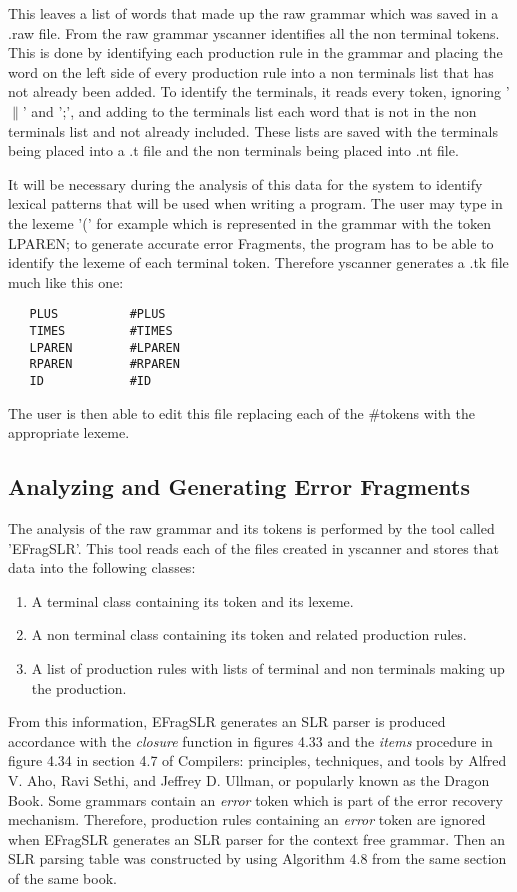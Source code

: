 \documentclass{article}
\begin{document}
This leaves a list of words that made up the raw grammar which was saved in a .raw file.  From the raw grammar yscanner identifies all the non terminal tokens.  This is done by identifying each production rule in the grammar and placing the word on the left side of every production rule into a non terminals list that has not already been added.  To identify the terminals, it reads every token, ignoring '$\|$' and ';', and adding to the terminals list each word that is not in the non terminals list and not already included.  These lists are saved with the terminals being placed into a .t file and the non terminals being placed into .nt file.

It will be necessary during the analysis of this data for the system to identify lexical patterns that will be used when writing a program.  The user may type in the lexeme '(' for example which is represented in the grammar with the token LPAREN; to generate accurate error Fragments, the program has to be able to identify the lexeme of each terminal token.  Therefore yscanner generates a .tk file much like this one:

\begin{verbatim}
   PLUS          #PLUS
   TIMES         #TIMES
   LPAREN        #LPAREN
   RPAREN        #RPAREN
   ID            #ID
\end{verbatim}

The user is then able to edit this file replacing each of the \#tokens with the appropriate lexeme.

\subsection{Analyzing and Generating Error Fragments}
The analysis of the raw grammar and its tokens is performed by the tool called 'EFragSLR'.  This tool reads each of the files created in yscanner and stores that data into the following classes:
 
\begin{enumerate}
\item A terminal class containing its token and its lexeme.
\item A non terminal class containing its token and related production rules.
\item A list of production rules with lists of terminal and non terminals making up the production.
\end{enumerate}

From this information, EFragSLR generates an SLR parser is produced accordance with the \emph{closure} function in figures 4.33 and the \emph{items} procedure in figure 4.34 in section 4.7 of Compilers: principles, techniques, and tools by Alfred V. Aho, Ravi Sethi, and Jeffrey D. Ullman, or popularly known as the Dragon Book.  Some grammars contain an \emph{error} token which is part of the error recovery mechanism.  Therefore, production rules containing an \emph{error} token are ignored when EFragSLR generates an SLR parser for the context free grammar.  Then an SLR parsing table was constructed by using Algorithm 4.8 from the same section of the same book. ~\cite{aho}
\end{document}
